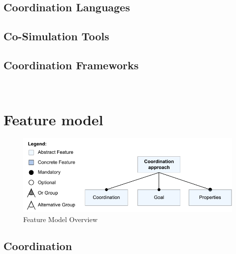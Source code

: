 \documentclass[runningheads]{llncs}
\begin{document}
\cite{woodsArchitectureDescriptionLanguages2005}

\subsection{Coordination Languages}

\subsection{Co-Simulation Tools}
\cite{gomesCoSimulationSurvey2019}

\subsection{Coordination Frameworks}
\cite{varalarsenBCOolBehavioralCoordination2016,varalarsenBehavioralCoordinationOperator2015}~\cite{krauterBehavioralConsistencyMultimodeling2023}


\section{Feature model} \label{sec:features}

\begin{figure}[ht]
	\centering
	\includegraphics[width=1\textwidth]{images/root}
	\caption{Feature Model Overview}
	\label{fig:feature_model_root}
\end{figure}

\subsection{Coordination}
\end{document}
